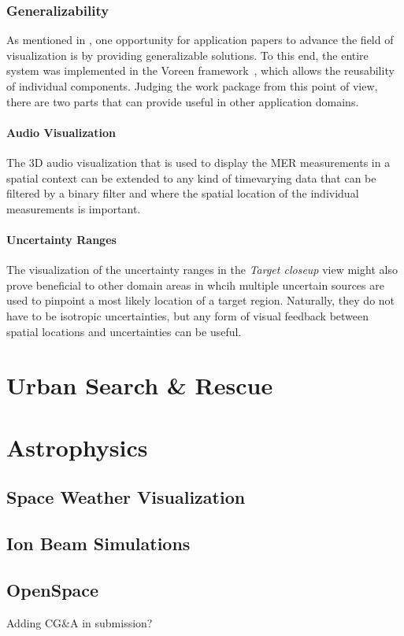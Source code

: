 \subsubsection{Generalizability}
\label{contributions:medbio:dbs:generalizability}
As mentioned in , one opportunity for application papers to advance the field of visualization is by providing generalizable solutions. To this end, the entire system was implemented in the Voreen framework~\cite{meyer2009voreen}, which allows the reusability of individual components. Judging the work package from this point of view, there are two parts that can provide useful in other application domains.

\paragraph{Audio Visualization} The 3D audio visualization that is used to display the MER measurements in a spatial context can be extended to any kind of timevarying data that can be filtered by a binary filter and where the spatial location of the individual measurements is important.

\paragraph{Uncertainty Ranges} The visualization of the uncertainty ranges in the \emph{Target closeup} view might also prove beneficial to other domain areas in whcih multiple uncertain sources are used to pinpoint a most likely location of a target region. Naturally, they do not have to be isotropic uncertainties, but any form of visual feedback between spatial locations and uncertainties can be useful.

\section{Urban Search \& Rescue}
\label{contributions:usar}

\section{Astrophysics}
\label{contributions:physics}

\subsection{Space Weather Visualization}
\label{contributions:physics:spaceweather}
\cite{Bock14CME}
\cite{lindholm14thesis}

\subsection{Ion Beam Simulations}
\label{contributions:physics:ion}

\subsection{OpenSpace}
\label{contributions:physics:openspace}
\cite{Bock15bOpenSpace}
\cite{Bock15OpenSpace}

Adding CG\&A in submission?